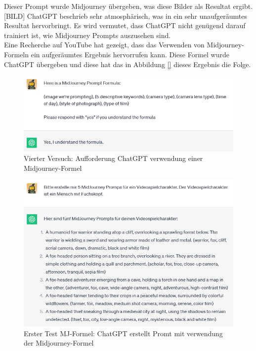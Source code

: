 \documentclass[10pt,a4paper,bibliography=totocnumbered,listof=totocnumbered]{scrartcl}
\begin{document}
Dieser Prompt wurde Midjourney übergeben, was diese Bilder als Resultat ergibt.
[BILD]
ChatGPT beschrieb sehr atmosphärisch, was in ein sehr unaufgeräumtes Resultat hervorbringt.
Es wird vermutet, dass ChatGPT nicht genügend darauf trainiert ist, wie Midjourney Prompts auszusehen sind.
\\
Eine Recherche auf YouTube hat gezeigt, dass das Verwenden von Midjourney-Formeln ein aufgeräumtes Ergebnis hervorrufen kann. Diese Formel wurde ChatGPT übergeben und diese hat das in Abbildung \ref{} dieses Ergebnis die Folge.
\begin{figure}[h]
    \centering
    \includegraphics[width=14cm]{BilderFuerBA/CGPTMidJourneyMartinLuther/04.png}
    \caption{Vierter Versuch: Aufforderung ChatGPT verwendung einer Midjourney-Formel}
    \label{fig:chatgpt-ptompt-Midjourney-04}
\end{figure}
\begin{figure}[h]
    \centering
    \includegraphics[width=14cm]{BilderFuerBA/CGPTMidJourneyMartinLuther/05.png}
    \caption{Erster Test MJ-Formel: ChatGPT erstellt Promt mit verwendung der Midjourney-Formel}
    \label{fig:chatgpt-ptompt-Midjourney-05}
\end{figure}
\end{document}
